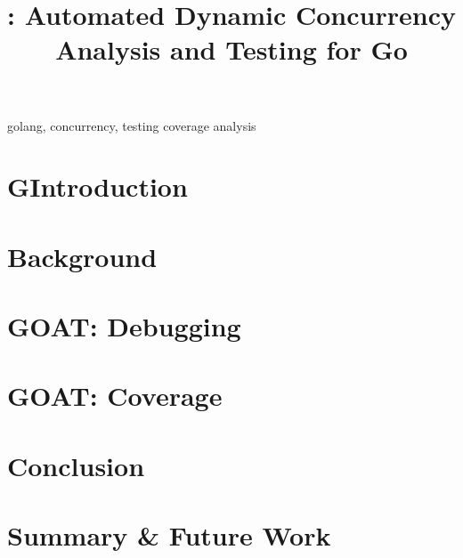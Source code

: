 \documentclass[conference]{IEEEtran}
\begin{document}
\title{\goat: Automated Dynamic Concurrency Analysis and Testing for Go}


\author{
\and
{}
}

\maketitle

\begin{abstract}

\end{abstract}

\begin{IEEEkeywords}
golang, concurrency, testing coverage analysis
\end{IEEEkeywords}

\section{GIntroduction}
\label{sec:Gintro}


\section{Background}
\label{sec:bg}


\section{GOAT: Debugging}
\label{sec:design}



\section{GOAT: Coverage}
\label{sec:coverage}



%

\section{Conclusion}
\label{sec:conclusion}


\section{Summary \& Future Work}
\label{sec:summary}





\end{document}
